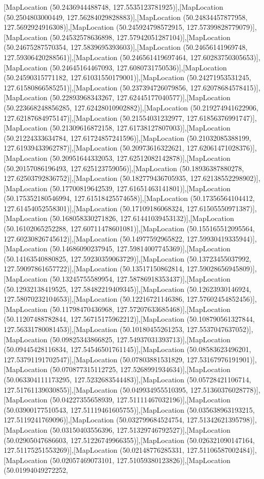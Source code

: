 [MapLocation (50.2436944488748, 127.5535123781925)],[MapLocation (50.2504803000449, 127.56284029828883)],[MapLocation (50.24834457877958, 127.5692924916308)],[MapLocation (50.245924798572915, 127.57399828779079)],[MapLocation (50.24532578636898, 127.57942051287104)],[MapLocation (50.24675287570354, 127.5839695393603)],[MapLocation (50.24656141969748, 127.59306420288561)],[MapLocation (50.246561419697464, 127.60283750305653)],[MapLocation (50.24645164467093, 127.6080731750536)],[MapLocation (50.24590315771182, 127.61031550179001)],[MapLocation (50.24271953531245, 127.61580866585251)],[MapLocation (50.237394726079856, 127.62078684578415)],[MapLocation (50.22893968343267, 127.62445177040577)],[MapLocation (50.223668248856285, 127.62428010902882)],[MapLocation (50.219274941622906, 127.62187684975147)],[MapLocation (50.21554031232977, 127.61856376991747)],[MapLocation (50.21309616872158, 127.61738127807003)],[MapLocation (50.21224333634784, 127.61724857241596)],[MapLocation (50.21032085388199, 127.61939433962787)],[MapLocation (50.20973616322621, 127.62061471028376)],[MapLocation (50.20951644332053, 127.62512082142878)],[MapLocation (50.20157086196493, 127.625123759056)],[MapLocation (50.18936387880278, 127.62503792836752)],[MapLocation (50.182779436705935, 127.62138552298902)],[MapLocation (50.17700819642539, 127.61651463141801)],[MapLocation (50.175352180546994, 127.61518425574658)],[MapLocation (50.17356564104412, 127.61454052558301)],[MapLocation (50.17109186068324, 127.61505550971387)],[MapLocation (50.168058330271826, 127.61441039453132)],[MapLocation (50.16102065252288, 127.60711478601081)],[MapLocation (50.155165512095564, 127.60230826745612)],[MapLocation (50.14977592965822, 127.59930419335944)],[MapLocation (50.14686090237945, 127.59814007745369)],[MapLocation (50.14163540880825, 127.59230359063729)],[MapLocation (50.13723455037992, 127.59097861657722)],[MapLocation (50.13517150862814, 127.59028656945809)],[MapLocation (50.13245755589954, 127.58786918353437)],[MapLocation (50.12932138419525, 127.58482219409345)],[MapLocation (50.12623930146924, 127.58070232104653)],[MapLocation (50.12216721146386, 127.57602454852456)],[MapLocation (50.11798470436968, 127.57207633685468)],[MapLocation (50.11207488782844, 127.56715175962212)],[MapLocation (50.108790561327844, 127.56331780081453)],[MapLocation (50.10180455261253, 127.5537047637052)],[MapLocation (50.09825343866825, 127.54937031393713)],[MapLocation (50.09445428116834, 127.54546501761145)],[MapLocation (50.08583623496201, 127.53791191702547)],[MapLocation (50.07803881531829, 127.53167976191901)],[MapLocation (50.070877315112725, 127.5268991934634)],[MapLocation (50.063304111173295, 127.5232683544483)],[MapLocation (50.05728421106714, 127.51761139030855)],[MapLocation (50.049934955510395, 127.51360376028778)],[MapLocation (50.04227355658939, 127.51111467032196)],[MapLocation (50.03900177510543, 127.51119461605755)],[MapLocation (50.035638963193215, 127.5119241769096)],[MapLocation (50.032799684524754, 127.51342621395798)],[MapLocation (50.03150403556396, 127.51329746792527)],[MapLocation (50.02905047686603, 127.51226749966355)],[MapLocation (50.026321090147164, 127.51175251553269)],[MapLocation (50.02148776285331, 127.51106587002484)],[MapLocation (50.02057469073101, 127.51059380123826)],[MapLocation (50.01994049272252, 